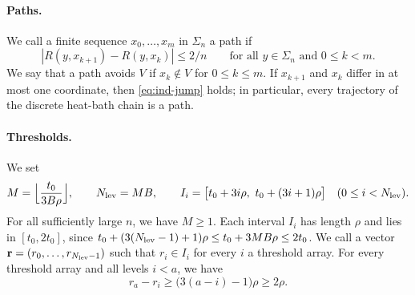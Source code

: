 \paragraph{Paths.} We call a finite sequence $x_0,\dots,x_m$ in $\Sigma_n$ a path if
\begin{equation}\label{eq:ind-jump}
 |R(y,x_{k+1})-R(y,x_k)|\le2/n\qquad\text{for all }y\in\Sigma_n\text{ and }0\le k<m.
\end{equation}
We say that a path avoids $V$ if $x_k\notin V$ for $0\le k\le m$. If $x_{k+1}$ and $x_k$ differ in at most one coordinate, then \eqref{eq:ind-jump} holds; in particular, every trajectory of the discrete heat-bath chain is a path.

\paragraph{Thresholds.} We set
\begin{equation}\label{b:dyn:threshold-intervals}
 M=\Bigl\lfloor\frac{t_0}{3B\rho}\Bigr\rfloor,\qquad N_{\rm lev}=MB,\qquad
 I_i=\bigl[t_0+3i\rho,\ t_0+(3i+1)\rho\bigr]\quad(0\le i<N_{\rm lev}).
\end{equation}
For all sufficiently large $n$, we have $M\ge1$. Each interval $I_i$ has length $\rho$ and lies in $[t_0,2t_0]$, since $t_0+(3(N_{\rm lev}-1)+1)\rho\le t_0+3MB\rho\le2t_0$. We call a vector $\mathbf r=(r_0,\dots,r_{N_{\rm lev}-1})$ such that $r_i\in I_i$ for every $i$ a threshold array. For every threshold array and all levels $i<a$, we have
\begin{equation}\label{b:dyn:geometry}
 r_a-r_i\ge\bigl(3(a-i)-1\bigr)\rho\ge2\rho.
\end{equation}

